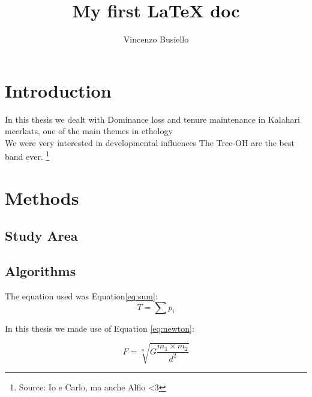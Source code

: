 \documentclass[12pt]{article}
\title{My first LaTeX doc}
\author{Vincenzo Busiello}
\begin{document}
\maketitle
\tableofcontents

\section{Introduction} 
\label{sec:intro} %

In this thesis we dealt with Dominance loss and tenure maintenance in Kalahari meerkats, one of the main themes in ethology \cite{Duncan2023}\\ 
We were very interested in developmental influences \cite{LaLoggia2024}
\bigskip{} %
The Tree-OH are the best band ever. 
\footnote{Source: Io e Carlo, ma anche Alfio <3} %


\section{Methods}
\subsection{Study Area}
\subsection{Algorithms}
The equation used was Equation\ref{eq:sum}: 
\begin{equation} 
    T = \sum p_i %
    \label{eq:sum}
\end{equation}

In this thesis we made use of Equation \ref{eq:newton}:

\begin{equation}
    F=\sqrt[n]{G \frac{m_1 \times m_2}{d^2}} %
    \label{eq:newton}
\end{equation}
\end{document}
